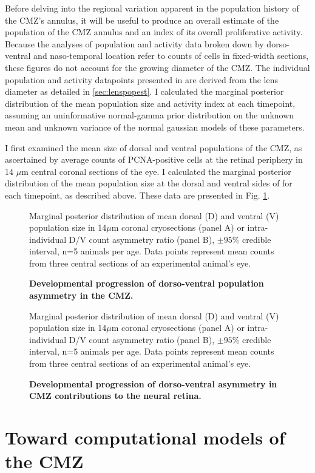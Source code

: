 Before delving into the regional variation apparent in the population history of the CMZ's annulus, it will be useful to produce an overall estimate of the population of the CMZ annulus and an index of its overall proliferative activity. Because the analyses of population and activity data broken down by dorso-ventral and naso-temporal location refer to counts of cells in fixed-width sections, these figures do not account for the growing diameter of the CMZ. The individual population and activity datapoints presented in are derived from the lens diameter as detailed in \autoref{sec:lenspopest}. I calculated the marginal posterior distribution of the mean population size and activity index at each timepoint, assuming an uninformative normal-gamma prior distribution on the unknown mean and unknown variance of the normal gaussian models of these parameters. 



I first examined the mean size of dorsal and ventral populations of the CMZ, as ascertained by average counts of PCNA-positive cells at the retinal periphery in 14 $\mu$m central coronal sections of the eye. I calculated the marginal posterior distribution of the mean population size at the dorsal and ventral sides of for each timepoint, as described above. These data are presented in Fig. \ref{DVontology}.

\begin{figure}[!h]
    \caption{{\bf Developmental progression of dorso-ventral population asymmetry in the CMZ.}}
    Marginal posterior distribution of mean dorsal (D) and ventral (V) population size in 14$\mu$m coronal cryosections (panel A) or intra-individual D/V count asymmetry ratio (panel B), $\pm 95\%$ credible interval, n=5 animals per age. Data points represent mean counts from three central sections of an experimental animal's eye. 
    \label{DVontology}
\end{figure}

\begin{figure}[!h]
    \caption{{\bf Developmental progression of dorso-ventral asymmetry in CMZ contributions to the neural retina.}}
    Marginal posterior distribution of mean dorsal (D) and ventral (V) population size in 14$\mu$m coronal cryosections (panel A) or intra-individual D/V count asymmetry ratio (panel B), $\pm 95\%$ credible interval, n=5 animals per age. Data points represent mean counts from three central sections of an experimental animal's eye. 
    \label{DVcontribution}
\end{figure}


\section{Toward computational models of the CMZ}